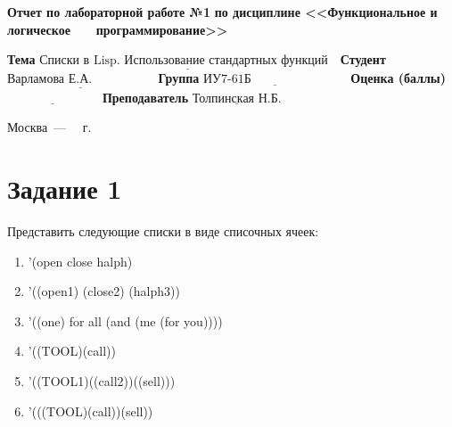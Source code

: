\documentclass[12pt]{report}
\begin{document}
\begin{titlepage}
		\begin{center}
			\noindent\begin{minipage}{1.1\textwidth}\centering
				\Large\textbf{  Отчет по лабораторной работе №1}\newline
				\textbf{по дисциплине <<Функциональное и логическое}\newline
				\textbf{~~~программирование>>}\newline\newline
			\end{minipage}
		\end{center}
		
		\noindent\textbf{Тема} $\underline{\text{Списки в  Lisp. Использование стандартных функций~~}}$\newline\newline
		\noindent\textbf{Студент} $\underline{\text{Варламова Е.А.~~~~~~~~~~~~~~~}}$\newline\newline
		\noindent\textbf{Группа} $\underline{\text{ИУ7-61Б~~~~~~~~~~~~~~~~~~~~~~~}}$\newline\newline
		\noindent\textbf{Оценка (баллы)} $\underline{\text{~~~~~~~~~~~~~~~~~~~~~~}}$\newline\newline
		\noindent\textbf{Преподаватель} $\underline{\text{Толпинская Н.Б.}}$\newline\newline\newline
		
		\begin{center}
			\vfill
			Москва~---~\the\year
			~г.
		\end{center}
	\end{titlepage}
\setcounter{page}{2}

\section*{Задание 1}
Представить следующие списки в виде списочных ячеек:
	\begin{enumerate}
		\item ’(open close halph)
		
		\item ’((open1) (close2) (halph3))
		
		\item ’((one) for all (and (me (for you))))
		
		\item ’((TOOL)(call))
		
		\item ’((TOOL1)((call2))((sell)))
		
		\item ’(((TOOL)(call))(sell))
	\end{enumerate}
	
\end{document}
